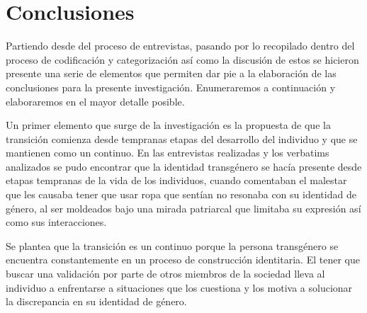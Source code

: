 \chapter{Conclusiones}\label{ch:conclusion}
%
%
%
%
%
%
%
%
%
%

Partiendo desde del proceso de entrevistas, pasando por lo recopilado dentro del
proceso de codificación y categorización así como la discusión de estos se
hicieron  presente una serie de elementos que permiten dar pie a la elaboración
de las conclusiones para la presente investigación. Enumeraremos a continuación
y elaboraremos en el mayor detalle posible.

Un primer elemento que surge de la investigación es la propuesta de que la
transición comienza desde tempranas etapas del desarrollo del individuo y que se
mantienen como un continuo. En las entrevistas realizadas y los verbatims
analizados se pudo encontrar que la identidad transgénero se hacía presente
desde etapas tempranas de la vida de los individuos, cuando comentaban el
malestar que les causaba tener que usar ropa que sentían no resonaba con su
identidad de género, al ser moldeados bajo una mirada patriarcal que limitaba su
expresión así como sus interacciones.

Se plantea que la transición es un continuo porque la persona transgénero se
encuentra constantemente en un proceso de construcción identitaria. El tener que
buscar una validación por parte de otros miembros de la sociedad lleva al
individuo a enfrentarse a situaciones que los cuestiona y los motiva a
solucionar la discrepancia en su identidad de género.

